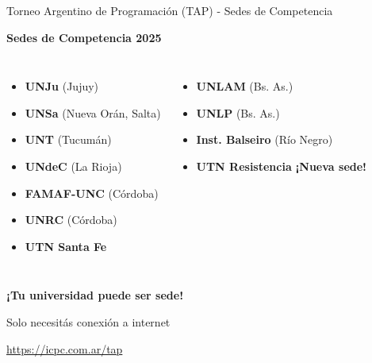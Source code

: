 \documentclass{beamer}
\begin{document}
\begin{frame}{Torneo Argentino de Programación (TAP) - Sedes de Competencia}
\begin{center}
\Large
\textbf{Sedes de Competencia 2025}

\vspace{0.2cm}

\normalsize
\begin{columns}[t]
\small
\begin{itemize}
\item \textbf{UNJu} (Jujuy)
\item \textbf{UNSa} (Nueva Orán, Salta)
\item \textbf{UNT} (Tucumán)
\item \textbf{UNdeC} (La Rioja)
\item \textbf{FAMAF-UNC} (Córdoba)
\item \textbf{UNRC} (Córdoba)
\item \textbf{UTN Santa Fe}
\end{itemize}

\small
\begin{itemize}
\item \textbf{UNLAM} (Bs. As.)
\item \textbf{UNLP} (Bs. As.)
\item \textbf{Inst. Balseiro} (Río Negro)
\item \textbf{UTN Resistencia} \textbf{¡Nueva sede!}
\end{itemize}

\end{columns}

\vspace{0.2cm}

\textbf{¡Tu universidad puede ser sede!}

\normalsize
Solo necesitás conexión a internet

\small
\url{https://icpc.com.ar/tap}
\end{center}
\end{frame}
\end{document}
